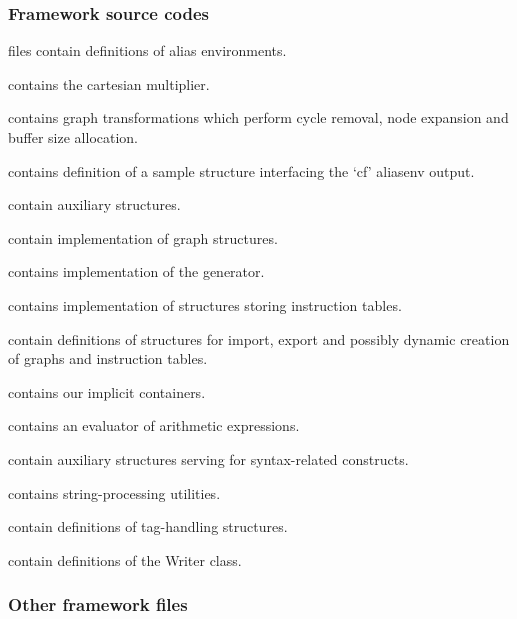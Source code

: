 \subsubsection{Framework source codes}
\begin{description}
  \item {} files contain definitions of alias environments.
  \item {} contains the cartesian multiplier.
  \item {} contains graph transformations which perform cycle removal, node expansion and buffer size allocation.
  \item {} contains definition of a sample structure interfacing the `cf' aliasenv output.
  \item {} contain auxiliary structures.
  \item {} contain implementation of graph structures.
  \item {} contains implementation of the generator.
  \item {} contains implementation of structures storing instruction tables.
  \item {} contain definitions of structures for import, export and possibly dynamic creation of graphs and instruction tables. 
  \item {} contains our implicit containers.
  \item {} contains an evaluator of arithmetic expressions.
  \item {} contain auxiliary structures serving for syntax-related constructs.
  \item {} contains string-processing utilities.
  \item {} contain definitions of tag-handling structures.
  \item {} contain definitions of the Writer class.
\end{description}

\subsubsection{Other framework files}


